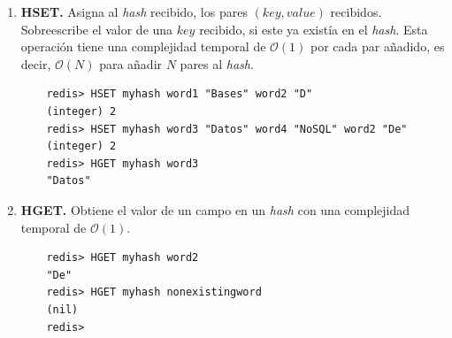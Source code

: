 \documentclass[pdflatex,sn-mathphys-num]{sn-jnl}
\theoremstyle{thmstyleone}%
\theoremstyle{thmstyletwo}%
\theoremstyle{thmstylethree}%
\begin{document}
\begin{enumerate}


    

    
        
    \item \textbf{HSET.} Asigna al \textit{hash} recibido, los pares $(key, value)$ recibidos. Sobreescribe el valor de una $key$ recibido, si este ya existía en el \textit{hash}. Esta operación tiene una complejidad temporal de $\mathcal{O}(1)$ por cada par añadido, es decir, $\mathcal{O}(N)$ para añadir $N$ pares al \textit{hash}.

    \begin{verbatim}
    redis> HSET myhash word1 "Bases" word2 "D"
    (integer) 2
    redis> HSET myhash word3 "Datos" word4 "NoSQL" word2 "De"
    (integer) 2
    redis> HGET myhash word3
    "Datos"
    \end{verbatim}

    \vspace{-0.5cm}
    
    \item \textbf{HGET.} Obtiene el valor de un campo en un \textit{hash} con una complejidad temporal de $\mathcal{O}(1)$.

    \begin{verbatim}
    redis> HGET myhash word2
    "De"
    redis> HGET myhash nonexistingword
    (nil)
    redis>
    \end{verbatim}

    \vspace{-0.5cm}
        

\end{enumerate}
\end{document}

